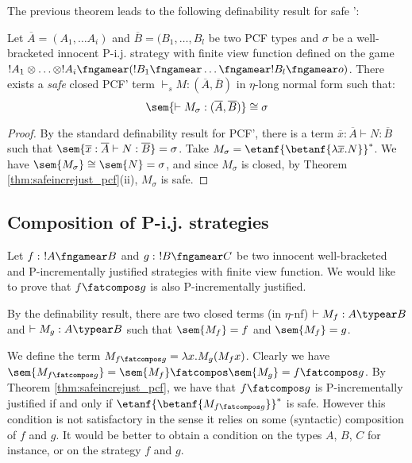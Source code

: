 The previous theorem leads to the following definability result for safe \pcf':
\begin{proposition}
\label{prop:safetydefinability}
Let $\overline{A}=(A_1,\ldots A_i)$ and $\overline{B} =(B_1, \ldots, B_l$ be two PCF types
and $\sigma$ be a well-bracketed innocent
P-i.j. strategy with finite view function defined on the game $!A_1 \otimes \ldots \otimes !A_i \fngamear (!B_1 \fngamear \ldots \fngamear !B_l \fngamear o) $. There exists a \emph{safe} closed PCF' term $\vdash_s M : (\overline{A},\overline{B})$ in $\eta$-long normal form such that:
$$ \sem{\vdash M_\sigma : (\overline{A},\overline{B})} \cong \sigma $$
\end{proposition}
\begin{proof}
By the standard definability result for PCF', there is a term $\overline{x} : \overline{A} \vdash N : \overline{B}$ such that $\sem{\overline{x} :\overline{A} \vdash N : \overline{B}} = \sigma$.
Take $M_\sigma = \etanf{\betanf{\lambda \overline{x} . N}}^*$.
We have $\sem{M_\sigma} \cong \sem{N} = \sigma$, and since $M_\sigma$ is closed, by Theorem  \ref{thm:safeincrejust_pcf}(ii), $M_\sigma$ is safe.
\end{proof}


\subsection{Composition of P-i.j. strategies}

Let $f:\ !A\fngamear B$ and $g:\ !B\fngamear C$ be two innocent well-bracketed and P-incrementally justified strategies with finite view function.
We would like to prove that $f\fatcompos g$ is also P-incrementally justified.

By the definability result, there are two closed terms (in $\eta$-nf) $\vdash M_f :A\typear B$  and $\vdash M_g :A\typear B$ such that $\sem{M_f} = f$
and $\sem{M_f} = g$.
 
We define the term $M_{f\fatcompos g} = \lambda x . M_g (M_f x)$. Clearly we have $\sem{M_{f\fatcompos g}} = \sem{M_f} \fatcompos \sem{M_g} = f\fatcompos g$. By Theorem \ref{thm:safeincrejust_pcf}, we have that $f\fatcompos g$ is P-incrementally justified if and only if $\etanf{\betanf{M_{f\fatcompos g}}}^*$ is safe. However this condition is not satisfactory in the sense it relies on some (syntactic) composition of $f$ and $g$. It would be better to obtain a condition on the types $A$, $B$, $C$ for instance, or on the strategy $f$ and $g$.

